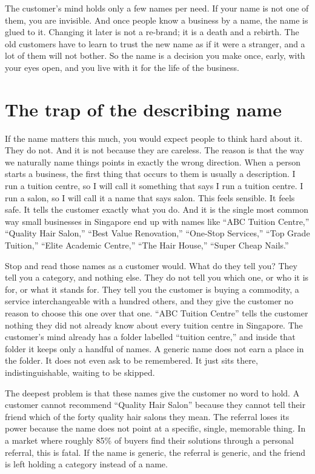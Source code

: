 \documentclass[10pt,twoside,openany]{memoir}
\newcommand{\needspacehead}{\needspace{4\baselineskip}}
\let\oldsection\section
\renewcommand{\section}{\needspacehead\oldsection}
\begin{document}
{The customer's mind holds only a few names per need. If your name is not
one of them, you are invisible. And once people know a business by a
name, the name is glued to it. Changing it later is not a re-brand; it
is a death and a rebirth. The old customers have to learn to trust the
new name as if it were a stranger, and a lot of them will not bother. So
the name is a decision you make once, early, with your eyes open, and
you live with it for the life of the business.

\section{The trap of the describing
name}\label{the-trap-of-the-describing-name}

If the name matters this much, you would expect people to think hard
about it. They do not. And it is not because they are careless. The
reason is that the way we naturally name things points in exactly the
wrong direction. When a person starts a business, the first thing that
occurs to them is usually a description. I run a tuition centre, so I
will call it something that says I run a tuition centre. I run a salon,
so I will call it a name that says salon. This feels sensible. It feels
safe. It tells the customer exactly what you do. And it is the single
most common way small businesses in Singapore end up with names like
``ABC Tuition Centre,'' ``Quality Hair Salon,'' ``Best Value
Renovation,'' ``One-Stop Services,'' ``Top Grade Tuition,'' ``Elite
Academic Centre,'' ``The Hair House,'' ``Super Cheap Nails.''

Stop and read those names as a customer would. What do they tell you?
They tell you a category, and nothing else. They do not tell you which
one, or who it is for, or what it stands for. They tell you the customer
is buying a commodity, a service interchangeable with a hundred others,
and they give the customer no reason to choose this one over that one.
``ABC Tuition Centre'' tells the customer nothing they did not already
know about every tuition centre in Singapore. The customer's mind
already has a folder labelled ``tuition centre,'' and inside that folder
it keeps only a handful of names. A generic name does not earn a place
in the folder. It does not even ask to be remembered. It just sits
there, indistinguishable, waiting to be skipped.

The deepest problem is that these names give the customer no word to
hold. A customer cannot recommend ``Quality Hair Salon'' because they
cannot tell their friend which of the forty quality hair salons they
mean. The referral loses its power because the name does not point at a
specific, single, memorable thing. In a market where roughly 85\% of
buyers find their solutions through a personal referral, this is fatal.
If the name is generic, the referral is generic, and the friend is left
holding a category instead of a name.

}
\end{document}
